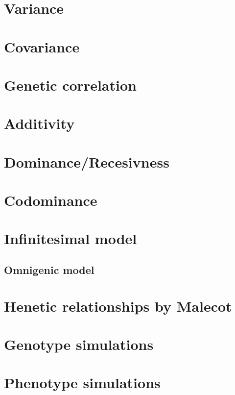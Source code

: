 \documentclass[]{book}
\theoremstyle{definition}
\theoremstyle{definition}
\theoremstyle{definition}
\theoremstyle{remark}
\begin{document}
\section{Variance}\label{variance}

\section{Covariance}\label{covariance}

\section{Genetic correlation}\label{genetic-correlation}

\section{Additivity}\label{additivity}

\section{Dominance/Recesivness}\label{dominancerecesivness}

\section{Codominance}\label{codominance}

\section{Infinitesimal model}\label{infinitesimal-model}

\subsection{Omnigenic model}\label{omnigenic-model}

\section{Henetic relationships by
Malecot}\label{henetic-relationships-by-malecot}

\section{Genotype simulations}\label{genotype-simulations}

\section{Phenotype simulations}\label{phenotype-simulations}
\end{document}
